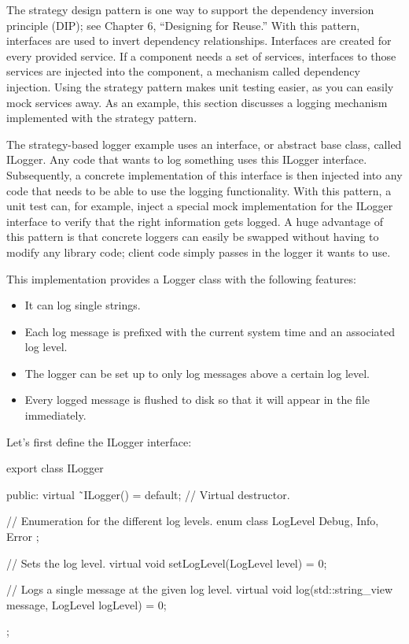 
The strategy design pattern is one way to support the dependency inversion principle (DIP); see Chapter 6, “Designing for Reuse.” With this pattern, interfaces are used to invert dependency relationships. Interfaces are created for every provided service. If a component needs a set of services, interfaces to those services are injected into the component, a mechanism called dependency injection. Using the strategy pattern makes unit testing easier, as you can easily mock services away. As an example, this section discusses a logging mechanism implemented with the strategy pattern.


The strategy-based logger example uses an interface, or abstract base class, called ILogger. Any code that wants to log something uses this ILogger interface. Subsequently, a concrete implementation of this interface is then injected into any code that needs to be able to use the logging functionality. With this pattern, a unit test can, for example, inject a special mock implementation for the ILogger interface to verify that the right information gets logged. A huge advantage of this pattern is that concrete loggers can easily be swapped without having to modify any library code; client code simply passes in the logger it wants to use.


This implementation provides a Logger class with the following features:

\begin{itemize}
\item
It can log single strings.

\item
Each log message is prefixed with the current system time and an associated log level.

\item
The logger can be set up to only log messages above a certain log level.

\item
Every logged message is flushed to disk so that it will appear in the file immediately.
\end{itemize}

Let’s first define the ILogger interface:

\begin{cpp}
export class ILogger
{
    public:
        virtual ˜ILogger() = default; // Virtual destructor.

        // Enumeration for the different log levels.
        enum class LogLevel { Debug, Info, Error };

        // Sets the log level.
        virtual void setLogLevel(LogLevel level) = 0;

        // Logs a single message at the given log level.
        virtual void log(std::string_view message, LogLevel logLevel) = 0;
};
\end{cpp}

